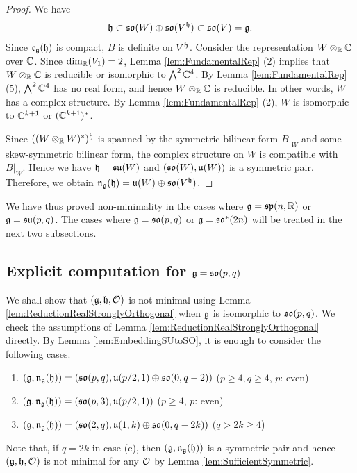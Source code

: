 \begin{proof}
	We have
	\begin{align*}
		\mathfrak{h} \subset \mathfrak{so}(W) \oplus \mathfrak{so}(V^{\mathfrak{h}}) \subset \mathfrak{so}(V) = \mathfrak{g}.
	\end{align*}
	Since $\mathfrak{c}_{\mathfrak{g}}(\mathfrak{h})$ is compact, $B$ is definite on $V^{\mathfrak{h}}$.
	Consider the representation $W\otimes_{\mathbb{R}} \mathbb{C}$ over $\mathbb{C}$.
	Since $\dim_{\mathbb{R}}(V_1) = 2$, Lemma \ref{lem:FundamentalRep} (2) implies that $W\otimes_{\mathbb{R}} \mathbb{C}$ is reducible or isomorphic to $\bigwedge\nolimits^2 \mathbb{C}^{4}$.
	By Lemma \ref{lem:FundamentalRep} (5), $\bigwedge\nolimits^2 \mathbb{C}^{4}$ has no real form, and hence $W\otimes_{\mathbb{R}} \mathbb{C}$ is reducible.
	In other words, $W$ has a complex structure.
	By Lemma \ref{lem:FundamentalRep} (2), $W$ is isomorphic to $\mathbb{C}^{k+1}$ or $(\mathbb{C}^{k+1})^*$.

	Since $((W \otimes_{\mathbb{R}} W)^*)^{\mathfrak{h}}$ is spanned by the symmetric bilinear form $B|_W$ and some skew-symmetric bilinear form, the complex structure on $W$ is compatible with $B|_W$.
	Hence we have $\mathfrak{h} = \mathfrak{su}(W)$ and $(\mathfrak{so}(W), \mathfrak{u}(W))$ is a symmetric pair.
	Therefore, we obtain $\mathfrak{n}_{\mathfrak{g}}(\mathfrak{h}) = \mathfrak{u}(W) \oplus \mathfrak{so}(V^{\mathfrak{h}})$.
\end{proof}

We have thus proved non-minimality in the cases where $\mathfrak{g}=\mathfrak{sp}(n,\mathbb{R})$ or $\mathfrak{g}=\mathfrak{su}(p,q)$.
The cases where $\mathfrak{g}=\mathfrak{so}(p,q)$ or $\mathfrak{g}=\mathfrak{so}^*(2n)$ will be treated in the next two subsections.

\subsection{Explicit computation for \texorpdfstring{$\mathfrak{g} = \mathfrak{so}(p,q)$}{g=SO(p,q)}}

 We shall show that $(\mathfrak{g}, \mathfrak{h}, \mathcal{O})$ is not minimal using Lemma \ref{lem:ReductionRealStronglyOrthogonal} when $\mathfrak{g}$ is isomorphic to $\mathfrak{so}(p,q)$.
We check the assumptions of Lemma \ref{lem:ReductionRealStronglyOrthogonal} directly.
By Lemma \ref{lem:EmbeddingSUtoSO}, it is enough to consider the following cases.
\begin{enumerate}[label=(\alph*)]
	\item $(\mathfrak{g}, \mathfrak{n}_{\mathfrak{g}}(\mathfrak{h})) = (\mathfrak{so}(p, q), \mathfrak{u}(p/2, 1)\oplus \mathfrak{so}(0, q-2))$ ($p\geq 4, q \geq 4$, $p$: even)
	\item $(\mathfrak{g}, \mathfrak{n}_{\mathfrak{g}}(\mathfrak{h})) = (\mathfrak{so}(p, 3), \mathfrak{u}(p/2, 1))$ ($p\geq 4$, $p$: even)
	\item $(\mathfrak{g}, \mathfrak{n}_{\mathfrak{g}}(\mathfrak{h})) = (\mathfrak{so}(2, q), \mathfrak{u}(1, k)\oplus \mathfrak{so}(0, q-2k))$ ($q > 2k \geq 4$)
\end{enumerate}
Note that, if $q = 2k$ in case (c), then $(\mathfrak{g}, \mathfrak{n}_{\mathfrak{g}}(\mathfrak{h}))$ is a symmetric pair and hence $(\mathfrak{g}, \mathfrak{h}, \mathcal{O})$ is not minimal for any $\mathcal{O}$ by Lemma \ref{lem:SufficientSymmetric}.

